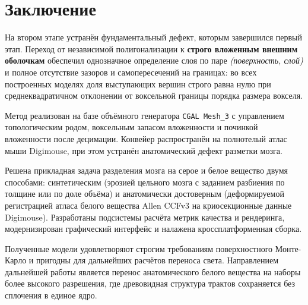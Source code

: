 \documentclass[a4paper,14pt]{article}
\begin{document}
\newpage
\section{Заключение}

На втором этапе устранён фундаментальный дефект, которым завершился первый этап. Переход от независимой полигонализации к \textbf{строго вложенным внешним оболочкам} обеспечил однозначное определение слоя по паре \emph{(поверхность, слой)} и полное отсутствие зазоров и самопересечений на границах: во всех построенных моделях доля выступающих вершин строго равна нулю при среднеквадратичном отклонении от воксельной границы порядка размера вокселя.

Метод реализован на базе объёмного генератора \texttt{CGAL Mesh\_3} с управлением топологическим родом, воксельным запасом вложенности и починкой вложенности после децимации. Конвейер распространён на полнотелый атлас мыши Digimouse, при этом устранён анатомический дефект разметки мозга.

Решена прикладная задача разделения мозга на серое и белое вещество двумя способами: синтетическим (эрозией цельного мозга с заданием разбиения по толщине или по доле объёма) и анатомически достоверным (деформируемой регистрацией атласа белого вещества Allen CCFv3 на криосекционные данные Digimouse). Разработаны подсистемы расчёта метрик качества и рендеринга, модернизирован графический интерфейс и налажена кроссплатформенная сборка.

Полученные модели удовлетворяют строгим требованиям поверхностного Монте-Карло и пригодны для дальнейших расчётов переноса света. Направлением дальнейшей работы является перенос анатомического белого вещества на наборы более высокого разрешения, где древовидная структура трактов сохраняется без сплочения в единое ядро.
\end{document}
